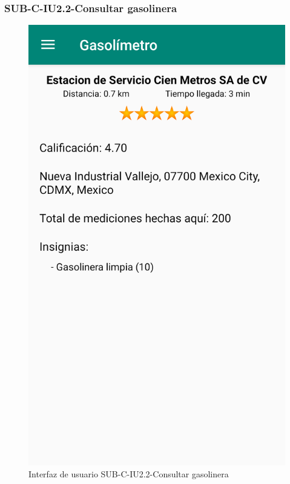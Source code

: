 \subsubsection{SUB-C-IU2.2-Consultar gasolinera}\label{SUB-C-IU2.2}
\begin{figure}[H]
	\centering
	\includegraphics[scale=.28]{Capitulo4/software/submodulos/clasificacion/images/sub-c-iu2_2}
	\caption{Interfaz de usuario SUB-C-IU2.2-Consultar gasolinera}
	\label{fig:sub-c-iu2.2}
\end{figure}